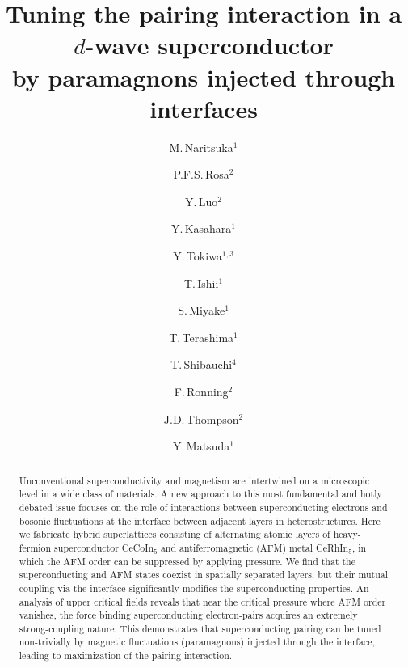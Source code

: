 \documentclass[twocolumn,preprintnumbers,amsmath,amssymb,prl]{revtex4}
\begin{document}
\title{
Tuning the pairing interaction in a $d$-wave superconductor \\by paramagnons injected through interfaces
}


\author{M.\,Naritsuka$^{1}$}
\author{P.F.S.\,Rosa$^{2}$}
\author{Y.\,Luo$^{2}$}
\author{Y.\,Kasahara$^1$}
\author{Y.\,Tokiwa$^{1,3}$}
\author{T.\,Ishii$^1$}
\author{S.\,Miyake$^1$}
\author{T.\,Terashima$^1$}
\author{T.\,Shibauchi$^4$}
\author{F.\,Ronning$^2$}
\author{J.D.\,Thompson$^2$}
\author{Y.\,Matsuda$^1$}







                             
\begin{abstract}

Unconventional superconductivity and magnetism are intertwined on a microscopic level in a wide class of materials.  A new approach to this most fundamental and hotly debated issue focuses on the role of interactions between superconducting electrons and bosonic fluctuations at the interface between adjacent layers in heterostructures.  
Here we fabricate hybrid superlattices consisting of alternating atomic layers of heavy-fermion superconductor CeCoIn$_5$ and antiferromagnetic (AFM) metal CeRhIn$_5$, in which the AFM order can be suppressed by applying pressure. 
We find that the superconducting and AFM states coexist in spatially separated layers, but their mutual coupling via the interface significantly modifies the superconducting properties. An analysis of upper critical fields reveals that near the critical pressure where AFM order vanishes, the force binding superconducting electron-pairs acquires an extremely strong-coupling nature. This demonstrates that superconducting pairing can be tuned non-trivially by magnetic fluctuations (paramagnons) injected through the interface, leading to maximization of the pairing interaction.

\end{abstract}
                            
\end{document}
